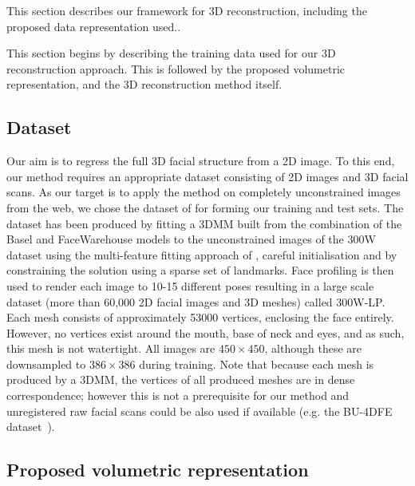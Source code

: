 This section describes our framework for 3D reconstruction, including the proposed data
representation used..

This section begins by describing the training data used for our 3D
reconstruction approach. This is followed by the proposed volumetric
representation, and the 3D reconstruction method itself.


\subsection{Dataset}

Our aim is to regress the full 3D facial structure from a 2D image. To
this end, our method requires an appropriate dataset consisting of 2D
images and 3D facial scans. As our target is to apply the method on
completely unconstrained images from the web, we chose the dataset of
\cite{zhu2016face} for forming our training and test sets. The dataset
has been produced by fitting a 3DMM built from the combination of the
Basel \cite{paysan20093d} and FaceWarehouse
\cite{cao2014facewarehouse} models to the unconstrained images of the
300W dataset \cite{sagonas2013semi} using the multi-feature fitting
approach of \cite{romdhani2005estimating}, careful initialisation and
by constraining the solution using a sparse set of landmarks. Face
profiling is then used to render each image to 10-15 different poses
resulting in a large scale dataset (more than 60,000 2D facial images
and 3D meshes) called 300W-LP. Each mesh consists of approximately
53000 vertices, enclosing the face entirely. However, no vertices
exist around the mouth, base of neck and eyes, and as such, this mesh
is not watertight. All images are $450 \times 450$, although these are
downsampled to $386 \times 386$ during training. Note that because
each mesh is produced by a 3DMM, the vertices of all produced meshes
are in dense correspondence; however this is not a prerequisite for
our method and unregistered raw facial scans could be also used if
available (e.g. the BU-4DFE dataset~\cite{yin2008high}).

\subsection{Proposed volumetric representation}

